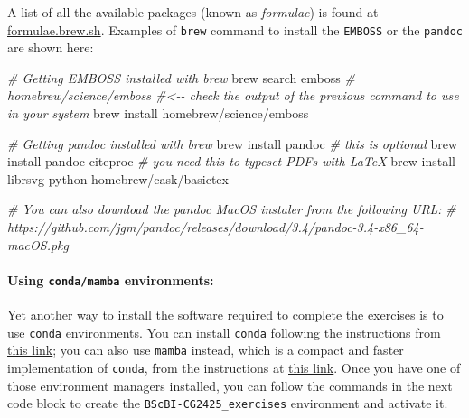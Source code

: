 \documentclass[10pt,a4paper,]{article}
\newenvironment{Shaded}{}{}
\newcommand{\CommentTok}[1]{\textcolor[rgb]{0.38,0.63,0.69}{\textit{#1}}}
\newcommand{\ExtensionTok}[1]{#1}
\newcommand{\NormalTok}[1]{#1}
\newcommand{\StringTok}[1]{\textcolor[rgb]{0.25,0.44,0.63}{#1}}
\newcommand{\VariableTok}[1]{\textcolor[rgb]{0.10,0.09,0.49}{#1}}
\begin{document}
\begin{Shaded}
\end{Shaded}

A list of all the available packages (known as \emph{formulae}) is found
at \href{https://formulae.brew.sh}{formulae.brew.sh}. Examples of
\texttt{brew} command to install the \texttt{EMBOSS} or the
\texttt{pandoc} are shown here:

\begin{Shaded}
\begin{Highlighting}[]
\CommentTok{\# Getting EMBOSS installed with brew}
\ExtensionTok{brew}\NormalTok{ search emboss}
\CommentTok{\# homebrew/science/emboss  \#\textless{}{-}{-} check the output of the previous command to use in your system}
\ExtensionTok{brew}\NormalTok{ install homebrew/science/emboss}

\CommentTok{\# Getting pandoc installed with brew}
\ExtensionTok{brew}\NormalTok{ install pandoc}
\CommentTok{\# this is optional}
\ExtensionTok{brew}\NormalTok{ install pandoc{-}citeproc}
\CommentTok{\# you need this to typeset PDFs with LaTeX}
\ExtensionTok{brew}\NormalTok{ install librsvg python homebrew/cask/basictex}

\CommentTok{\# You can also download the pandoc MacOS instaler from the following URL:}
\CommentTok{\# https://github.com/jgm/pandoc/releases/download/3.4/pandoc{-}3.4{-}x86\_64{-}macOS.pkg}
\end{Highlighting}
\end{Shaded}

\hypertarget{using-condamamba-environments}{%
\paragraph{\texorpdfstring{Using \texttt{conda/mamba}
environments:}{Using conda/mamba environments:}}\label{using-condamamba-environments}}

Yet another way to install the software required to complete the
exercises is to use \texttt{conda} environments. You can install
\texttt{conda} following the instructions from
\href{https://conda.io/projects/conda/en/latest/user-guide/install/index.html}{this
link}; you can also use \texttt{mamba} instead, which is a compact and
faster implementation of \texttt{conda}, from the instructions at
\href{https://github.com/conda-forge/miniforge\#install}{this link}.
Once you have one of those environment managers installed, you can
follow the commands in the next code block to create the
\texttt{BScBI-CG2425\_exercises} environment and activate it.
\end{document}
